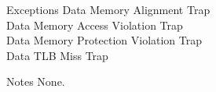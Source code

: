 \begin{iPageDescEntry}{Exceptions}
  Data Memory Alignment Trap\\
  Data Memory Access Violation Trap\\
  Data Memory Protection Violation Trap\\
  Data TLB Miss Trap
\end{iPageDescEntry}

\begin{iPageDescEntry}{Notes}
  None. 
\end{iPageDescEntry} 